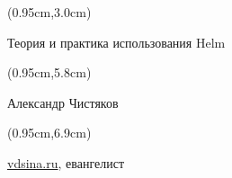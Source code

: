 \documentclass[xetex,18pt,aspectratio=43]{beamer}
\title[Практика использования Helm]{}
\author[Александр Чистяков, vdsina.ru]{}
\date{}
\newcommand\Bigfont{\fontsize{20}{20}\selectfont}
\newcommand\Authorfont{\fontsize{17}{17}\selectfont}
\newcommand\Orgfont{\fontsize{13}{13}\selectfont}
\begin{document}
{ %
    \begin{frame}[plain]
      \begin{textblock*}{\framewidth}(0.95cm,3.0cm) %
        \Bigfont
          \begin{center}
          Теория и практика использования Helm
          \end{center}
      \end{textblock*}
      \begin{textblock*}{\framewidth}(0.95cm,5.8cm) %
        \Authorfont
          \begin{center}
          Александр Чистяков
          \end{center}
      \end{textblock*}
      \begin{textblock*}{\framewidth}(0.95cm,6.9cm) %
        \Orgfont
          \begin{center}
          \href{https://vdsina.ru}{\color{blue}vdsina.ru}, евангелист
          \end{center}
      \end{textblock*}
     \end{frame}
}
\end{document}
